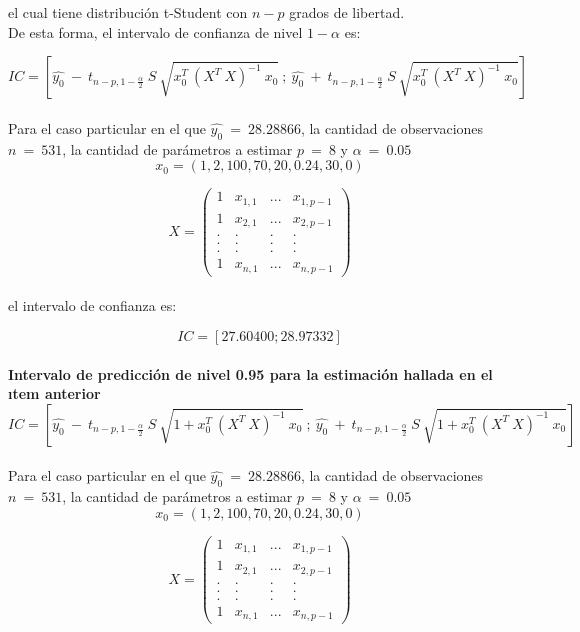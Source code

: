 \documentclass{article}
\begin{document}
\noindent
el cual tiene distribución t-Student con \(n-p\) grados de libertad.\\

\noindent
De esta forma, el intervalo de confianza de nivel \(1-\alpha\) es:

$$IC = [\hat{y_0} \ - \ t_{n-p, 1-\frac{\alpha}{2}} \ S \ \sqrt{x_0^T \ (X^T \ X)^{-1} \ x_0} \ ; \ \hat{y_0} \ + \ t_{n-p, 1-\frac{\alpha}{2}} \ S \ \sqrt{x_0^T \ (X^T \ X)^{-1} \ x_0}]$$\\

\noindent
Para el caso particular en el que \(\hat{y_0} \ = \ 28.28866\), la cantidad de observaciones \(n \ = \ 531\), la cantidad de parámetros a estimar \(p \ = \ 8\) y \(\alpha \ = \ 0.05\)\\

$$x_0 = (1, 2, 100, 70, 20, 0.24, 30, 0)$$

$$
X = \begin{pmatrix}
1 & x_{1,1} & ... & x_{1,p-1}\\
1 & x_{2,1} & ... & x_{2,p-1}\\
. & . & . & .\\
. & . & . & .\\
. & . & . & .\\
1 & x_{n,1} & ... & x_{n,p-1}
\end{pmatrix}
$$\\

\noindent
el intervalo de confianza es:

$$IC = [27.60400; 28.97332]$$\\

\noindent
\textbf{Intervalo de predicción de nivel 0.95 para la estimación hallada en el ıtem anterior}\\

$$IC = [\hat{y_0} \ - \ t_{n-p, 1-\frac{\alpha}{2}} \ S \ \sqrt{1 + x_0^T \ (X^T \ X)^{-1} \ x_0} \ ; \ \hat{y_0} \ + \ t_{n-p, 1-\frac{\alpha}{2}} \ S \ \sqrt{1 + x_0^T \ (X^T \ X)^{-1} \ x_0}]$$\\

\noindent
Para el caso particular en el que \(\hat{y_0} \ = \ 28.28866\), la cantidad de observaciones \(n \ = \ 531\), la cantidad de parámetros a estimar \(p \ = \ 8\) y \(\alpha \ = \ 0.05\)\\

$$x_0 = (1, 2, 100, 70, 20, 0.24, 30, 0)$$

$$
X = \begin{pmatrix}
1 & x_{1,1} & ... & x_{1,p-1}\\
1 & x_{2,1} & ... & x_{2,p-1}\\
. & . & . & .\\
. & . & . & .\\
. & . & . & .\\
1 & x_{n,1} & ... & x_{n,p-1}
\end{pmatrix}
$$\\
\end{document}
